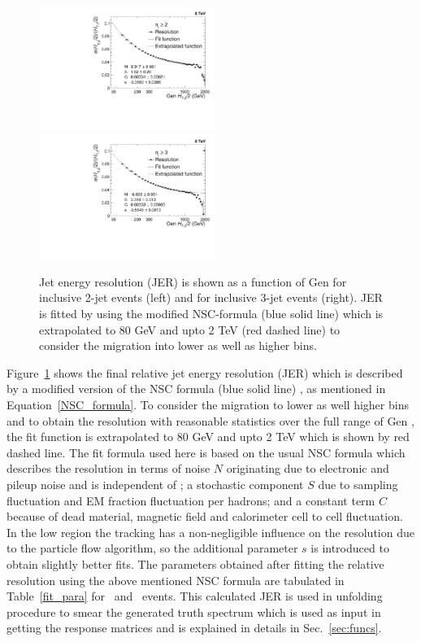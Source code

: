 \begin{figure}[!htbp]
 \begin{center}
 \includegraphics[width=0.51\textwidth]{Plots_HT_2_150/Extrapolate_Sigma_Value_Res_2_crystal_range_ext.pdf}%
 ~~\includegraphics[width=0.51\textwidth]{Plots_HT_2_150/Extrapolate_Sigma_Value_Res_3_crystal_ext.pdf}
 \caption{Jet energy resolution (JER) is shown as a function of Gen \httwo for inclusive 2-jet events (left) and for inclusive 3-jet events (right). JER is fitted by using the modified NSC-formula (blue solid line) which is extrapolated to 80 GeV and upto 2 TeV (red dashed line) to consider the migration into lower as well as higher bins.}
    \label{fig:resolution}
  \end{center}
\end{figure}
 
Figure~\ref{fig:resolution} shows the final relative jet energy resolution (JER) which is described by a modified version of the NSC formula (blue solid line) \cite{CMS:2011esa}, as mentioned in Equation~\ref{NSC_formula}. To consider the migration to lower as well higher bins and to obtain the resolution with reasonable statistics over the full range of Gen \httwons, the fit function is extrapolated to 80 GeV and upto 2 TeV which is shown by red dashed line. The fit formula used here is based on the usual NSC formula which describes the resolution in terms of noise $N$ originating due to electronic and pileup noise and is independent of \httwons; a stochastic component $S$ due to sampling fluctuation and EM fraction fluctuation per hadrons; and a constant term $C$ because of dead material, magnetic field and calorimeter cell to cell fluctuation. In the low \httwo region the tracking has a non-negligible influence on the resolution due to the particle flow algorithm, so the additional parameter $s$ is introduced to obtain slightly better fits. The parameters obtained after fitting the relative resolution using the above mentioned NSC formula are tabulated in Table~\ref{fit_para} for \njt~and \njth~events. This calculated JER is used in unfolding procedure to smear the generated truth spectrum which is used as input in getting the response matrices and is explained in details in Sec.~\ref{sec:funcs}.

